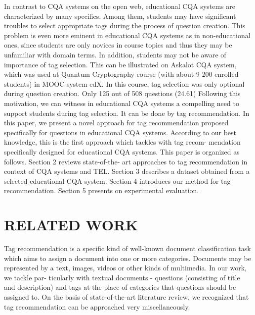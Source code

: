 \documentclass{sig-alternate}
\begin{document}
	In contrast to CQA systems on the open web, educational CQA
systems are characterized by many specifics. Among them, students
may have significant troubles to select appropriate tags during the
process of question creation. This problem is even more eminent in
educational CQA systems as in non-educational ones, since students
are only novices in course topics and thus they may be unfamiliar
with domain terms. In addition, students may not be aware of
importance of tag selection. This can be illustrated on Askalot CQA
system, which was used at Quantum Cryptography course (with
about 9 200 enrolled students) in MOOC system edX. In this course,
tag selection was only optional during question creation. Only 125
out of 508 questions (24.61)
Following this motivation, we can witness in educational CQA
systems a compelling need to support students during tag selection.
It can be done by tag recommendation. In this paper, we present
a novel approach for tag recommendation proposed specifically
for questions in educational CQA systems. According to our best
knowledge, this is the first approach which tackles with tag recom-
mendation specifically designed for educational CQA systems.
This paper is organized as follows. Section 2 reviews state-of-the-
art approaches to tag recommendation in context of CQA systems
and TEL. Section 3 describes a dataset obtained from a selected
educational CQA system. Section 4 introduces our method for tag
recommendation. Section 5 presents on experimental evaluation.

\section{RELATED WORK}
Tag recommendation is a specific kind of well-known document
classification task which aims to assign a document into one or
more categories. Documents may be represented by a text, images,
videos or other kinds of multimedia. In our work, we tackle par-
ticularly with textual documents - questions (consisting of title
and description) and tags at the place of categories that questions
should be assigned to.
On the basis of state-of-the-art literature review, we recognized
that tag recommendation can be approached very miscellaneously.
\end{document}
